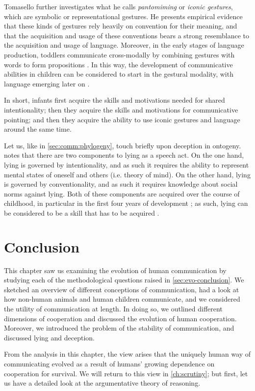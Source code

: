Tomasello further investigates what he calls \emph{pantomiming} or \emph{iconic gestures}, which are symbolic or representational gestures. 
He presents empirical evidence that these kinds of gestures rely heavily on convention for their meaning, and that the acquisition and usage of these conventions bears a strong resemblance to the acquisition and usage of language.
Moreover, in the early stages of language production, toddlers communicate cross-modally by combining gestures with words to form propositions \citep{Iverson05}.
In this way, the development of communicative abilities in children can be considered to start in the gestural modality, with language emerging later on \citep{Tomasello08}.

In short, infants first acquire the skills and motivations needed for shared intentionality; then they acquire the skills and motivations for communicative pointing; and then they acquire the ability to use iconic gestures and language around the same time.

Let us, like in \cref{sec:comm:phylogeny}, touch briefly upon deception in ontogeny. \citet{Lee13} notes that there are two components to lying as a speech act. On the one hand, lying is governed by intentionality, and as such it requires the ability to represent mental states of oneself and others (i.e. theory of mind). On the other hand, lying is governed by conventionality, and as such it requires knowledge about social norms against lying.
Both of these components are acquired over the course of childhood, in particular in the first four years of development \citep{Lee13}; as such, lying can be considered to be a skill that has to be acquired \citep{Meibauer18}.



\section{Conclusion}

This chapter saw us examining the evolution of human communication by studying each of the methodological questions raised in \cref{sec:evo-conclusion}. We sketched an overview of different conceptions of communication, had a look at how non-human animals and human children communicate, and we considered the utility of communication at length. In doing so, we outlined different dimensions of cooperation and discussed the evolution of human cooperation. Moreover, we introduced the problem of the stability of communication, and discussed lying and deception.

From the analysis in this chapter, the view arises that the uniquely human way of communicating evolved as a result of humans' growing dependence on cooperation for survival.
We will return to this view in \cref{ch:scrutiny}; but first, let us have a detailed look at the argumentative theory of reasoning.

